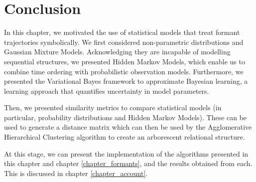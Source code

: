 \documentclass[../main.tex]{subfiles}
\begin{document}
\section{Conclusion}
In this chapter, we motivated the use of statistical models that treat formant trajectories symbolically. We first considered non-parametric distributions and Gaussian Mixture Models. Acknowledging they are incapable of modelling sequential structures, we presented Hidden Markov Models, which enable us to combine time ordering with probabilistic observation models. Furthermore, we presented the Variational Bayes framework to approximate Bayesian learning, a learning approach that quantifies uncertainty in model parameters.
\par Then, we presented similarity metrics to compare statistical models (in particular, probability distributions and Hidden Markov Models). These can be used to generate a distance matrix which can then be used by the Agglomerative Hierarchical Clustering algorithm to create an arborescent relational structure.
\par At this stage, we can present the implementation of the algorithms presented in this chapter and chapter \ref{chapter_formants}, and the results obtained from each. This is discussed in chapter \ref{chapter_account}.
\end{document}

